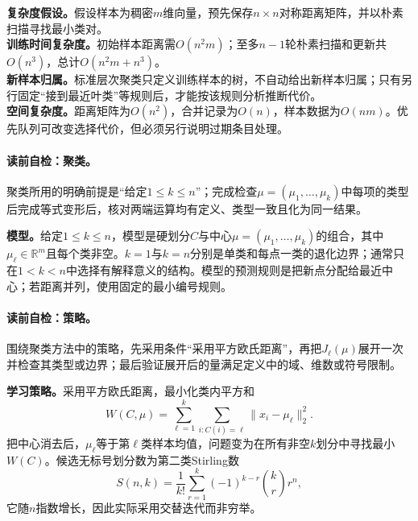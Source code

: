 \begin{complexitybox}
\textbf{复杂度假设。}假设样本为稠密$m$维向量，预先保存$n\times n$对称距离矩阵，并以朴素扫描寻找最小类对。\\
\textbf{训练时间复杂度。}初始样本距离需$O(n^2m)$；至多$n-1$轮朴素扫描和更新共$O(n^3)$，总计$O(n^2m+n^3)$。\\
\textbf{新样本归属。}标准层次聚类只定义训练样本的树，不自动给出新样本归属；只有另行固定“接到最近叶类”等规则后，才能按该规则分析推断代价。\\
\textbf{空间复杂度。}距离矩阵为$O(n^2)$，合并记录为$O(n)$，样本数据为$O(nm)$。优先队列可改变选择代价，但必须另行说明过期条目处理。
\end{complexitybox}

\paragraph{读前自检：\kMeans{}聚类。}\kMeans{}聚类所用的明确前提是“给定$1\leq k\leq n$”；完成检查$\mu=(\mu_1,\ldots,\mu_k)$中每项的类型后完成等式变形后，核对两端运算均有定义、类型一致且化为同一结果。\par

\label{struct:V4-C02-CH08}
\textbf{模型。}给定$1\leq k\leq n$，\kMeans{}模型是硬划分$C$与中心$\mu=(\mu_1,\ldots,\mu_k)$的组合，其中$\mu_\ell\in\mathbb R^m$且每个类非空。$k=1$与$k=n$分别是单类和每点一类的退化边界；通常只在$1<k<n$中选择有解释意义的结构。模型的预测规则是把新点分配给最近中心；若距离并列，使用固定的最小编号规则。

\paragraph{读前自检：策略。}围绕聚类方法中的策略，先采用条件“采用平方欧氏距离”，再把$J_\ell(\mu)$展开一次并检查其类型或边界；最后验证展开后的量满足定义中的域、维数或符号限制。\par

\label{struct:V4-C02-CH09}
\textbf{学习策略。}采用平方欧氏距离，最小化类内平方和
\[
W(C,\mu)=\sum_{\ell=1}^{k}\sum_{i:C(i)=\ell}\|x_i-\mu_\ell\|_2^2.
\]
把中心消去后，$\mu_\ell$等于第$\ell$类样本均值，问题变为在所有非空$k$划分中寻找最小$W(C)$。候选无标号划分数为第二类Stirling数
\[
S(n,k)=\frac1{k!}\sum_{r=1}^{k}(-1)^{k-r}\binom{k}{r}r^n,
\]
它随$n$指数增长，因此实际采用交替迭代而非穷举。

